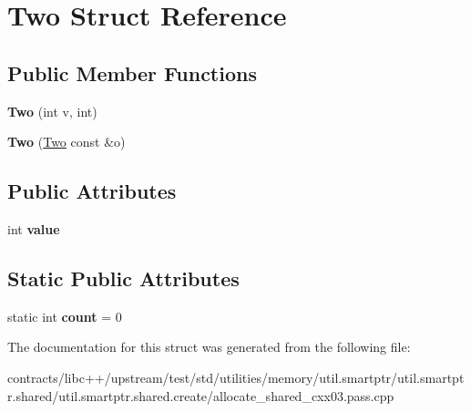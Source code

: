 \hypertarget{struct_two}{}\section{Two Struct Reference}
\label{struct_two}
\subsection*{Public Member Functions}
\begin{DoxyCompactItemize}
\item 
\mbox{\label{struct_two_a4135e9407bc6c97ecad03f9dca47e954}} 
{\bfseries Two} (int v, int)
\item 
\mbox{\label{struct_two_aa8712aa16b3e74a96e9ad7fa9c897906}} 
{\bfseries Two} (\mbox{\hyperlink{struct_two}{Two}} const \&o)
\end{DoxyCompactItemize}
\subsection*{Public Attributes}
\begin{DoxyCompactItemize}
\item 
\mbox{\label{struct_two_a6f80125dfec46c03f453c395285ad6bc}} 
int {\bfseries value}
\end{DoxyCompactItemize}
\subsection*{Static Public Attributes}
\begin{DoxyCompactItemize}
\item 
\mbox{\label{struct_two_af11942fee1c802576dbcbd1d13c9504e}} 
static int {\bfseries count} = 0
\end{DoxyCompactItemize}


The documentation for this struct was generated from the following file\+:\begin{DoxyCompactItemize}
\item 
contracts/libc++/upstream/test/std/utilities/memory/util.\+smartptr/util.\+smartptr.\+shared/util.\+smartptr.\+shared.\+create/allocate\+\_\+shared\+\_\+cxx03.\+pass.\+cpp\end{DoxyCompactItemize}
